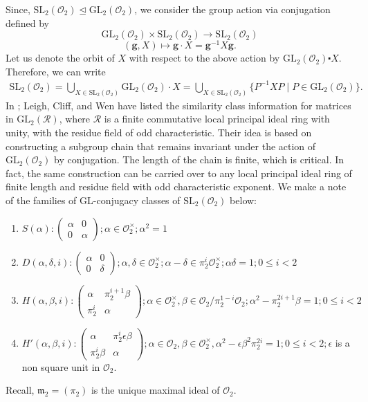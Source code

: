 \documentclass[10pt,twoside]{amsart}
\newcommand{\GL}{\mathrm{GL}}
\newcommand{\SL}{\mathrm{SL}}
\newcommand{\R}{\mathcal{O}_2}
\theoremstyle{definition}
\theoremstyle{definition}
\begin{document}
Since, $\SL_2(\R)\unlhd\GL_2(\R)$, we consider the group action via conjugation defined by $$\GL_2(\R) \times\SL_2(\R) \rightarrow \SL_2(\R)$$ $$(\textbf{g}, X)\mapsto \textbf{g}\cdot X=\textbf{g}^{-1}X\textbf{g}.$$ 
Let us denote the orbit of $X$ with respect to the above action by $\GL_2(\R)\centerdot X$.  Therefore, we can write 
\begin{align*}
\SL_2(\R) = \bigcup\limits_{X\in\SL_2(\R)} \GL_2(\R)\cdot X = \bigcup\limits_{X \in \SL_2(\R)} \{ P^{-1} X P \mid P \in \GL_2(\R) \}.
\end{align*}
In \cite[page 1290]{BarringtonCliffWen2010}; Leigh, Cliff, and Wen have listed the similarity class information for matrices in $\GL_2(\mathcal{R})$, where $\mathcal{R} $ is a finite commutative local principal ideal ring with unity, with the residue field of odd characteristic. Their idea is based on constructing a subgroup chain that remains invariant under the action of $\GL_2(\R)$ by conjugation. The length of the chain is finite, which is critical. In fact, the same construction can be carried over to any local principal ideal ring of finite length and residue field with odd characteristic exponent. We make a note of the families of $\GL$-conjugacy classes of $\SL_2(\R)$ below: 
\begin{enumerate}
\item $S(\alpha)  : \left( \begin{array}{cc} \alpha & 0 \\
0 & \alpha\end{array} \right);  \alpha\in \R^{\times}; \alpha^2=1$
\item $D(\alpha,\delta,i)  :  \left( \begin{array}{cc} \alpha & 0 \\
0 & \delta\end{array} \right);   \alpha,\delta\in \R^{\times};\alpha-\delta\in \pi_2^i\R^{\times}; \alpha\delta=1;  0\leq i<2$
\item $H(\alpha,\beta,i) :  \left( \begin{array}{cc} \alpha & \pi_2^{i+1}\beta \\
\pi_2^i & \alpha\end{array} \right); \alpha\in \R^{\times},\beta\in \R/\pi_2^{1-i}\R; \alpha^2-\pi_2^{2i+1}\beta=1;  0\leq i<2 $
\item $H'(\alpha,\beta,i)  :  \left( \begin{array}{cc} \alpha & \pi_2^i\epsilon\beta \\
\pi_2^i\beta & \alpha\end{array} \right); \alpha\in \R,\beta\in \R^{\times}, \alpha^2-\epsilon\beta^2\pi_2^{2i}=1; 0\leq i<2; \epsilon$  is a non square unit in $\R$.
\end{enumerate}
Recall, $\mathfrak{m}_2=(\pi_2)$ is the unique maximal ideal of $\R$.
\end{document}
